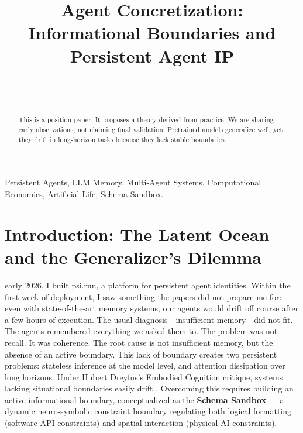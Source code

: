 \documentclass[10pt,journal,compsoc]{IEEEtran}
\begin{document}
\title{Agent Concretization: Informational Boundaries and Persistent Agent IP}

\author{
     \\
     \\
}

\maketitle

\begin{abstract}
This is a position paper. It proposes a theory derived from practice. We are sharing early observations, not claiming final validation. Pretrained models generalize well, yet they drift in long-horizon tasks because they lack stable boundaries.
\end{abstract}

\begin{IEEEkeywords}
Persistent Agents, LLM Memory, Multi-Agent Systems, Computational Economics, Artificial Life, Schema Sandbox.
\end{IEEEkeywords}

\section{Introduction: The Latent Ocean and the Generalizer's Dilemma}
 early 2026, I built psi.run, a platform for persistent agent identities. Within the first week of deployment, I saw something the papers did not prepare me for: even with state-of-the-art memory systems, our agents would drift off course after a few hours of execution. The usual diagnosis---insufficient memory---did not fit. The agents remembered everything we asked them to. The problem was not recall. It was coherence. The root cause is not insufficient memory, but the absence of an active boundary. This lack of boundary creates two persistent problems: stateless inference at the model level, and attention dissipation over long horizons. Under Hubert Dreyfus's Embodied Cognition critique, systems lacking situational boundaries easily drift \cite[p.156]{dreyfus1972}. Overcoming this requires building an active informational boundary, conceptualized as the \textbf{Schema Sandbox} --- a dynamic neuro-symbolic constraint boundary regulating both logical formatting (software API constraints) and spatial interaction (physical AI constraints).
\end{document}
